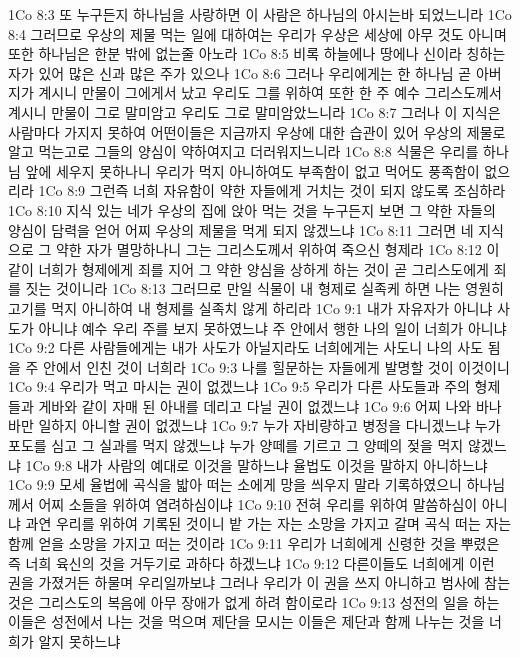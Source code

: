 1Co 8:3  또 누구든지 하나님을 사랑하면 이 사람은 하나님의 아시는바 되었느니라
1Co 8:4  그러므로 우상의 제물 먹는 일에 대하여는 우리가 우상은 세상에 아무 것도 아니며 또한 하나님은 한분 밖에 없는줄 아노라
1Co 8:5  비록 하늘에나 땅에나 신이라 칭하는 자가 있어 많은 신과 많은 주가 있으나
1Co 8:6  그러나 우리에게는 한 하나님 곧 아버지가 계시니 만물이 그에게서 났고 우리도 그를 위하여 또한 한 주 예수 그리스도께서 계시니 만물이 그로 말미암고 우리도 그로 말미암았느니라
1Co 8:7  그러나 이 지식은 사람마다 가지지 못하여 어떤이들은 지금까지 우상에 대한 습관이 있어 우상의 제물로 알고 먹는고로 그들의 양심이 약하여지고 더러워지느니라
1Co 8:8  식물은 우리를 하나님 앞에 세우지 못하나니 우리가 먹지 아니하여도 부족함이 없고 먹어도 풍족함이 없으리라
1Co 8:9  그런즉 너희 자유함이 약한 자들에게 거치는 것이 되지 않도록 조심하라
1Co 8:10  지식 있는 네가 우상의 집에 앉아 먹는 것을 누구든지 보면 그 약한 자들의 양심이 담력을 얻어 어찌 우상의 제물을 먹게 되지 않겠느냐
1Co 8:11  그러면 네 지식으로 그 약한 자가 멸망하나니 그는 그리스도께서 위하여 죽으신 형제라
1Co 8:12  이같이 너희가 형제에게 죄를 지어 그 약한 양심을 상하게 하는 것이 곧 그리스도에게 죄를 짓는 것이니라
1Co 8:13  그러므로 만일 식물이 내 형제로 실족케 하면 나는 영원히 고기를 먹지 아니하여 내 형제를 실족치 않게 하리라
1Co 9:1  내가 자유자가 아니냐 사도가 아니냐 예수 우리 주를 보지 못하였느냐 주 안에서 행한 나의 일이 너희가 아니냐
1Co 9:2  다른 사람들에게는 내가 사도가 아닐지라도 너희에게는 사도니 나의 사도 됨을 주 안에서 인친 것이 너희라
1Co 9:3  나를 힐문하는 자들에게 발명할 것이 이것이니
1Co 9:4  우리가 먹고 마시는 권이 없겠느냐
1Co 9:5  우리가 다른 사도들과 주의 형제들과 게바와 같이 자매 된 아내를 데리고 다닐 권이 없겠느냐
1Co 9:6  어찌 나와 바나바만 일하지 아니할 권이 없겠느냐
1Co 9:7  누가 자비량하고 병정을 다니겠느냐 누가 포도를 심고 그 실과를 먹지 않겠느냐 누가 양떼를 기르고 그 양떼의 젖을 먹지 않겠느냐
1Co 9:8  내가 사람의 예대로 이것을 말하느냐 율법도 이것을 말하지 아니하느냐
1Co 9:9  모세 율법에 곡식을 밟아 떠는 소에게 망을 씌우지 말라 기록하였으니 하나님께서 어찌 소들을 위하여 염려하심이냐
1Co 9:10  전혀 우리를 위하여 말씀하심이 아니냐 과연 우리를 위하여 기록된 것이니 밭 가는 자는 소망을 가지고 갈며 곡식 떠는 자는 함께 얻을 소망을 가지고 떠는 것이라
1Co 9:11  우리가 너희에게 신령한 것을 뿌렸은즉 너희 육신의 것을 거두기로 과하다 하겠느냐
1Co 9:12  다른이들도 너희에게 이런 권을 가졌거든 하물며 우리일까보냐 그러나 우리가 이 권을 쓰지 아니하고 범사에 참는 것은 그리스도의 복음에 아무 장애가 없게 하려 함이로라
1Co 9:13  성전의 일을 하는 이들은 성전에서 나는 것을 먹으며 제단을 모시는 이들은 제단과 함께 나누는 것을 너희가 알지 못하느냐
